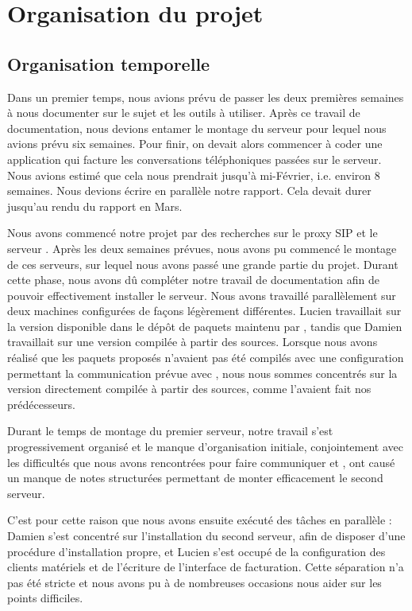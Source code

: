 \section{Organisation du projet}

\subsection{Organisation temporelle}




Dans un premier temps, nous avions prévu de passer les deux premières semaines à nous documenter sur le sujet et les outils à utiliser. Après ce travail de documentation, nous devions entamer le montage du serveur pour lequel nous avions prévu six semaines. Pour finir, on devait alors commencer à coder une application qui facture les conversations téléphoniques passées sur le serveur. Nous avions estimé que cela nous prendrait jusqu'à mi-Février, i.e. environ 8 semaines. Nous devions écrire en parallèle notre rapport. Cela devait durer jusqu'au rendu du rapport en Mars. 

Nous avons commencé notre projet par des recherches sur le proxy SIP {\kam} et le serveur {\frad}. Après les deux semaines prévues, nous avons pu commencé le montage de ces serveurs, sur lequel nous avons passé une grande partie du projet. Durant cette phase, nous avons dû compléter notre travail de documentation afin de pouvoir effectivement installer le serveur.
Nous avons travaillé parallèlement sur deux machines configurées de façons légèrement différentes. Lucien  travaillait sur la version disponible dans le dépôt de paquets maintenu par {\kam}, tandis que Damien  travaillait sur une version compilée à partir des sources. Lorsque nous avons réalisé que les paquets proposés n’avaient pas été compilés avec une configuration permettant la communication prévue avec {\frad}, nous nous sommes concentrés sur la version directement compilée à partir des sources, comme l’avaient fait nos prédécesseurs.

Durant le temps de montage du premier serveur, notre travail s’est progressivement organisé et le manque d’organisation initiale, conjointement avec les difficultés que nous avons rencontrées pour faire communiquer {\kam} et {\frad}, ont causé un manque de notes structurées permettant de monter efficacement le second serveur.


C’est pour cette raison que nous avons ensuite exécuté des tâches en parallèle : Damien  s’est concentré sur l’installation du second serveur, afin de disposer d’une procédure d’installation propre, et Lucien  s’est occupé de la configuration des clients matériels et de l’écriture de l’interface de facturation. Cette séparation n’a pas été stricte et nous avons pu à de nombreuses occasions nous aider sur les points difficiles.

